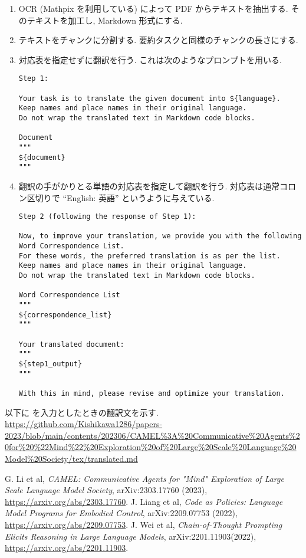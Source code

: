 \documentclass[uplatex, a4j, 10pt, fleqn, dvipdfmx]{article}
\begin{document}
\begin{enumerate}
    \item
          OCR (Mathpix を利用している) によって PDF からテキストを抽出する.
          そのテキストを加工し, Markdown 形式にする.
    \item
          テキストをチャンクに分割する.
          要約タスクと同様のチャンクの長さにする.
    \item 対応表を指定せずに翻訳を行う.
          これは次のようなプロンプトを用いる.
          \begin{lstlisting}[caption = 文章翻訳のプロンプト, label = program2]
Step 1:

Your task is to translate the given document into ${language}.
Keep names and place names in their original language.
Do not wrap the translated text in Markdown code blocks.

Document
"""
${document}
"""
          \end{lstlisting}
    \item 翻訳の手がかりとる単語の対応表を指定して翻訳を行う.
          対応表は通常コロン区切りで ``English: 英語'' というように与えている.
          \begin{lstlisting}[caption = 翻訳改善のプロンプト, label = program3]
Step 2 (following the response of Step 1):

Now, to improve your translation, we provide you with the following Word Correspondence List.
For these words, the preferred translation is as per the list.
Keep names and place names in their original language.
Do not wrap the translated text in Markdown code blocks.

Word Correspondence List
"""
${correspondence_list}
"""

Your translated document:
"""
${step1_output}
"""

With this in mind, please revise and optimize your translation.
          \end{lstlisting}
\end{enumerate}

以下に \cite{ref2} を入力としたときの翻訳文を示す.\\
\url{https://github.com/Kishikawa1286/papers-2023/blob/main/contents/202306/CAMEL%3A%20Communicative%20Agents%20for%20%22Mind%22%20Exploration%20of%20Large%20Scale%20Language%20Model%20Society/tex/translated.md}

\begin{thebibliography}{99}
     G. Li et al,
    \textit{CAMEL: Communicative Agents for "Mind" Exploration of Large Scale Language Model Society},
    arXiv:2303.17760 (2023),
    \url{https://arxiv.org/abs/2303.17760}.
     J. Liang et al,
    \textit{Code as Policies: Language Model Programs for Embodied Control},
    arXiv:2209.07753 (2022),
    \url{https://arxiv.org/abs/2209.07753}.
     J. Wei et al,
    \textit{Chain-of-Thought Prompting Elicits Reasoning in Large Language Models},
    arXiv:2201.11903(2022),
    \url{https://arxiv.org/abs/2201.11903}.
\end{thebibliography}
\end{document}
